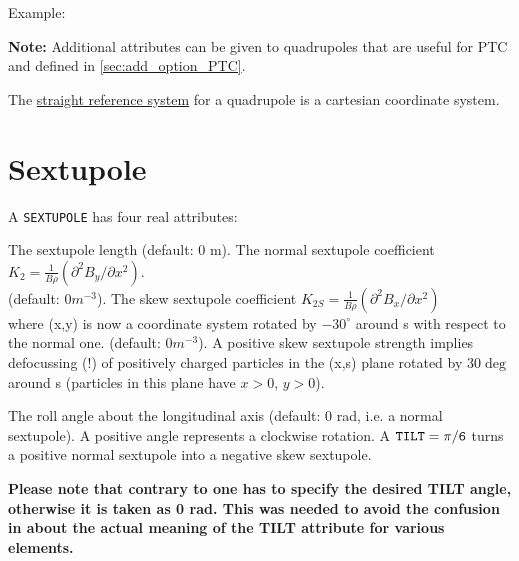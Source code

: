 Example: 

{\bf Note:} Additional attributes can be given to quadrupoles that
are useful for PTC and defined in \ref{sec:add_option_PTC}.

The \href{local_system.html#straight}{straight reference system} for
a quadrupole is a cartesian coordinate system.


\section{Sextupole}
\label{sec:sextupole}


A {\tt SEXTUPOLE} has four real attributes: 
\begin{madlist}
     The sextupole length (default: 0 m). 
     The normal sextupole coefficient $K_2 = \frac{1}{B \rho}
      (\partial^2 B_y / \partial x^2)$. \\       
      (default: $0 m^{-3}$). 
     The skew sextupole coefficient 
      $K_{2S} = \frac{1}{B \rho} (\partial^2 B_x / \partial x^2)$ \\
      where (x,y) is now a coordinate system rotated by $-30^\circ$ around s with
      respect to the normal one. (default: $0 m^{-3}$). A positive skew
      sextupole strength implies defocussing (!) of positively charged
      particles in the (x,s) plane rotated by $30\deg$ around s (particles in
      this plane have $x > 0$, $y > 0$).  

     The roll angle about the longitudinal axis (default: 0
      rad, i.e. a normal sextupole). A positive angle represents a
      clockwise rotation. A $\tt{TILT} = \pi/6$ turns a positive normal sextupole
      into a negative skew sextupole.
      
      \textbf{  Please note that contrary to \madeight one has to specify the
        desired TILT angle, otherwise it is taken as 0 rad. This was needed to
        avoid the confusion in \madeight about the actual meaning of the TILT
        attribute for various elements. } 
\end{madlist}


